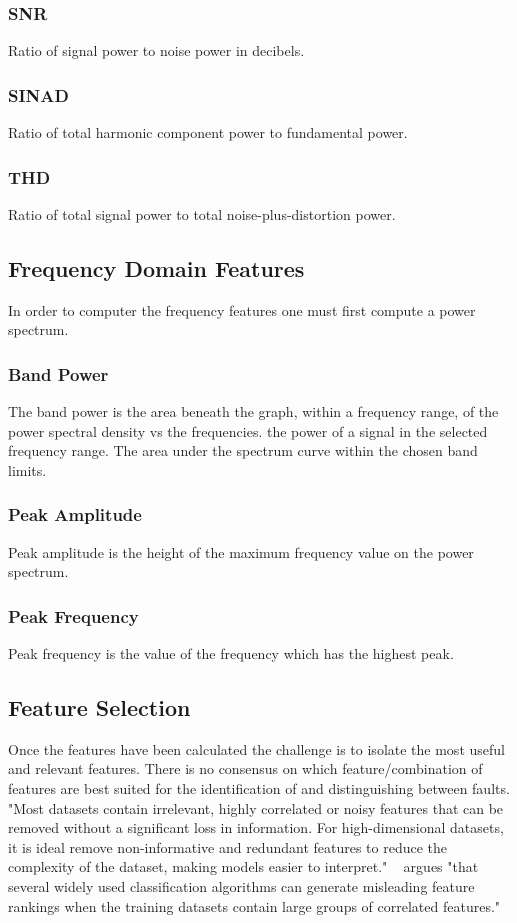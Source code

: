 \documentclass[]{article}
\begin{document}
\subsubsection*{\gls{SNR}}
Ratio of signal power to noise power in decibels.
\subsubsection*{\gls{SINAD}}
Ratio of total harmonic component power to fundamental power.
\subsubsection*{\gls{THD}}
Ratio of total signal power to total noise-plus-distortion power.
\subsection{Frequency Domain Features}
In order to computer the frequency features one must first compute a power spectrum.
\subsubsection*{Band Power}
The band power is the area beneath the graph, within a frequency range, of the power spectral density vs the frequencies.
the power of a signal in the selected frequency range.
The area under the spectrum curve within the chosen band limits.
\subsubsection*{Peak Amplitude}
Peak amplitude is the height of the maximum frequency value on the power spectrum.
\subsubsection*{Peak Frequency}
Peak frequency is the value of the frequency which has the highest peak.
\subsection{Feature Selection}
Once the features have been calculated the challenge is to isolate the most useful and relevant features. There is no consensus on which feature/combination of features are best suited for the identification of and distinguishing between faults. "Most datasets contain irrelevant, highly correlated or noisy features that can be removed without a significant loss in information. For high-dimensional datasets, it is ideal remove non-informative and redundant features to reduce the complexity of the dataset, making models easier to interpret."
~\cite{tolocsi2011classification} argues "that several widely used classification algorithms
can generate misleading feature rankings when the training datasets contain large groups of correlated features."
\end{document}
